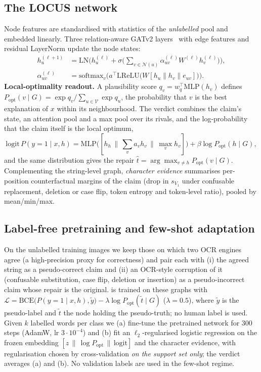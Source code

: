 \subsection{The LOCUS network}
\label{sec:model}
Node features are standardised with statistics of the \emph{unlabelled} pool and embedded linearly. Three
relation-aware GATv2 layers~\cite{brody2022gatv2} with edge features and residual LayerNorm update the node states:
\begin{equation}
\begin{aligned}
h_u^{(\ell+1)}&=\mathrm{LN}\Big(h_u^{(\ell)}+\sigma\Big(\textstyle\sum_{v\in\mathcal{N}(u)}\alpha_{uv}^{(\ell)}W^{(\ell)}h_v^{(\ell)}\Big)\Big),\\
\alpha_{uv}^{(\ell)}&=\mathrm{softmax}_v\Big(a^\top\mathrm{LReLU}\big(W[h_u\|h_v\|e_{uv}]\big)\Big).
\end{aligned}
\end{equation}
\textbf{Local-optimality readout.} A plausibility score $q_v=w_q^\top\mathrm{MLP}(h_v)$ defines
$P_{\mathrm{opt}}(v\mid G)=\exp q_v/\sum_{u\in\mathcal{V}}\exp q_u$, the probability that $v$ is the best explanation of
$x$ within its neighbourhood. The verdict combines the claim's state, an attention pool and a max pool over its rivals,
and the log-probability that the claim itself is the local optimum,
\begin{equation}
\mathrm{logit}\,P(y=1\mid x,h)=\mathrm{MLP}\big([h_h\,\|\,\textstyle\sum_v a_v h_v\,\|\,\max_v h_v]\big)+\beta\log P_{\mathrm{opt}}(h\mid G),
\end{equation}
and the same distribution gives the repair $\hat t=\arg\max_{v\neq h}P_{\mathrm{opt}}(v\mid G)$. Complementing the
string-level graph, \emph{character evidence} summarises per-position counterfactual margins of the claim (drop in
$s_{V_1}$ under confusable replacement, deletion or case flip, token entropy and token-level ratio), pooled by
mean/min/max.

\subsection{Label-free pretraining and few-shot adaptation}
\label{sec:pretrain}
On the unlabelled training images we keep those on which two OCR engines agree (a high-precision proxy for
correctness) and pair each with (i) the agreed string as a pseudo-correct claim and (ii) an OCR-style corruption of it
(confusable substitution, case flip, deletion or insertion) as a pseudo-incorrect claim whose repair is the original.
\ours{} is trained on these graphs with
$\mathcal{L}=\mathrm{BCE}\big(P(y=1\mid x,h),\tilde y\big)-\lambda\log P_{\mathrm{opt}}(\tilde t\mid G)$ ($\lambda=0.5$),
where $\tilde y$ is the pseudo-label and $\tilde t$ the node holding the pseudo-truth; no human label is used. Given
$k$ labelled words per class we (a) fine-tune the pretrained network for 300 steps (AdamW, lr $3\cdot10^{-4}$) and
(b) fit an $\ell_2$-regularised logistic regression on the frozen embedding $[z\,\|\,\log P_{\mathrm{opt}}\,\|\,\mathrm{logit}]$
and the character evidence, with regularisation chosen by cross-validation \emph{on the support set only}; the verdict
averages (a) and (b). No validation labels are used in the few-shot regime.

